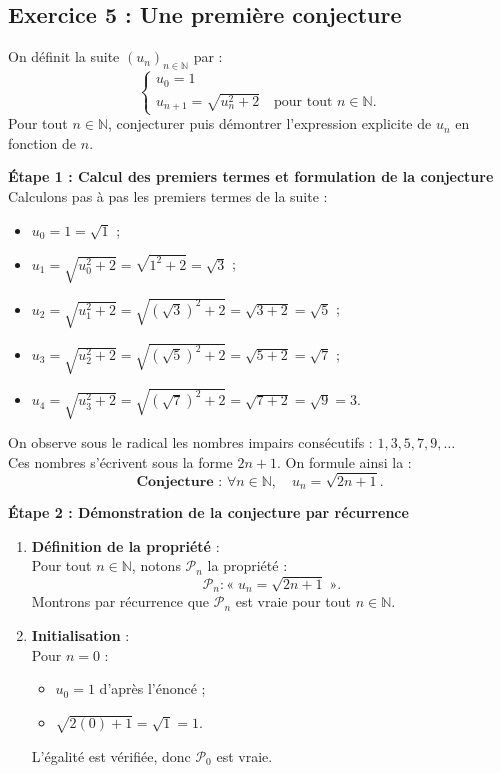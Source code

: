 \documentclass[11pt,a4paper]{article}
\newcommand{\N}{\mathbb{N}}
\begin{document}
\subsection*{Exercice 5 : Une première conjecture}

On définit la suite $(u_n)_{n \in \N}$ par :
\[
\begin{cases}
u_0 = 1 \\
u_{n+1} = \sqrt{u_n^2 + 2} \quad \text{pour tout } n \in \N.
\end{cases}
\]
Pour tout $n \in \N$, conjecturer puis démontrer l'expression explicite de $u_n$ en fonction de $n$.

\begin{correctionbox}
\textbf{Étape 1 : Calcul des premiers termes et formulation de la conjecture}\\
Calculons pas à pas les premiers termes de la suite :
\begin{itemize}
    \item $u_0 = 1 = \sqrt{1}$ ;
    \item $u_1 = \sqrt{u_0^2 + 2} = \sqrt{1^2 + 2} = \sqrt{3}$ ;
    \item $u_2 = \sqrt{u_1^2 + 2} = \sqrt{(\sqrt{3})^2 + 2} = \sqrt{3 + 2} = \sqrt{5}$ ;
    \item $u_3 = \sqrt{u_2^2 + 2} = \sqrt{(\sqrt{5})^2 + 2} = \sqrt{5 + 2} = \sqrt{7}$ ;
    \item $u_4 = \sqrt{u_3^2 + 2} = \sqrt{(\sqrt{7})^2 + 2} = \sqrt{7 + 2} = \sqrt{9} = 3$.
\end{itemize}
On observe sous le radical les nombres impairs consécutifs : $1, 3, 5, 7, 9, \dots$\\
Ces nombres s'écrivent sous la forme $2n+1$. On formule ainsi la :
\[
\textbf{Conjecture : } \forall n \in \N, \quad u_n = \sqrt{2n+1}.
\]

\textbf{Étape 2 : Démonstration de la conjecture par récurrence}
\begin{enumerate}[label=\textbf{\arabic*.}]
    \item \textbf{Définition de la propriété} :\\
    Pour tout $n \in \N$, notons $\mathcal{P}_n$ la propriété :
    \[
    \mathcal{P}_n : « \; u_n = \sqrt{2n+1} \; ».
    \]
    Montrons par récurrence que $\mathcal{P}_n$ est vraie pour tout $n \in \N$.

    \item \textbf{Initialisation} :\\
    Pour $n = 0$ :
    \begin{itemize}
        \item $u_0 = 1$ d'après l'énoncé ;
        \item $\sqrt{2(0) + 1} = \sqrt{1} = 1$.
    \end{itemize}
    L'égalité est vérifiée, donc $\mathcal{P}_0$ est vraie.


\end{enumerate}
\end{correctionbox}
\end{document}
